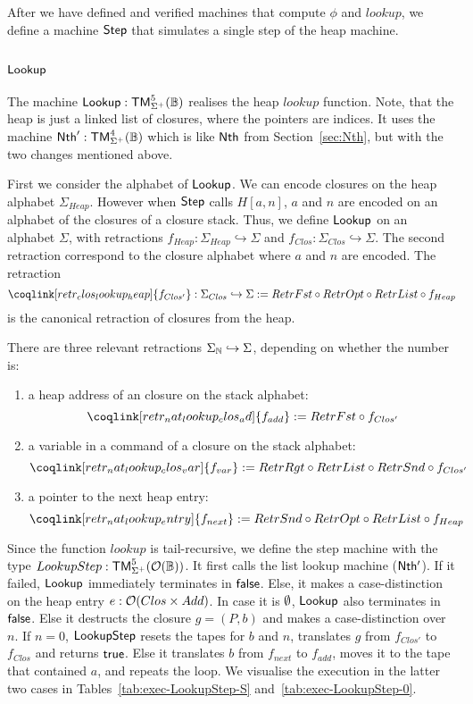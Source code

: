 After we have defined and verified machines that compute $\phi$ and $lookup$, we define a machine $\mathsf{Step}$ that simulates a single step of the heap
machine.


\subsection{$\mathsf{Lookup}$}
\label{sec:Lookup}
%

The machine $\mathsf{Lookup} : \mathsf{TM}_{\Sigma^+}^5(\mathbb{B})$ realises the heap $lookup$ function.  Note, that the heap is just a linked list of closures, where
the pointers are indices.  It uses the machine $\mathsf{Nth}' : \mathsf{TM}_{\Sigma^+}^4(\mathbb{B})$ which is like $\mathsf{Nth}$ from Section~\ref{sec:Nth}, but with the
two changes mentioned above.

First we consider the alphabet of $\mathsf{Lookup}$.  We can encode closures on the heap alphabet $\Sigma_{Heap}$.  However when $\mathsf{Step}$ calls
$H[a,n]$, $a$ and $n$ are encoded on an alphabet of the closures of a closure stack.  Thus, we define $\mathsf{Lookup}$ on an alphabet $\Sigma$, with
retractions $f_{Heap} : \Sigma_{Heap} \hookrightarrow \Sigma$ and $f_{Clos} : \Sigma_{Clos} \hookrightarrow \Sigma$.  The second retraction correspond
to the closure alphabet where $a$ and $n$ are encoded.  The retraction
\[
  \coqlink[retr_clos_lookup_heap]{f_{Clos'}} : \Sigma_{Clos} \hookrightarrow \Sigma := RetrFst \circ RetrOpt \circ RetrList \circ f_{Heap}
\]
is the canonical retraction of closures from the heap.

There are three relevant retractions $\Sigma_{\mathbb{N}} \hookrightarrow \Sigma$, depending on whether the number is:
\begin{enumerate}
\item a heap address of an closure on the stack alphabet:
  \[
    \coqlink[retr_nat_lookup_clos_ad]{f_{add}} := RetrFst \circ f_{Clos'}
  \]
\item a variable in a command of a closure on the stack alphabet:
  \[
    \coqlink[retr_nat_lookup_clos_var]{f_{var}} := RetrRgt \circ RetrList \circ RetrSnd \circ f_{Clos'}
  \]
\item a pointer to the next heap entry:
  \[
    \coqlink[retr_nat_lookup_entry]{f_{next}} := RetrSnd \circ RetrOpt \circ RetrList \circ f_{Heap}
  \]
\end{enumerate}

Since the function $lookup$ is tail-recursive, we define the step machine with the type $LookupStep : \mathsf{TM}_{\Sigma^+}^5(\mathcal{O}(\mathbb{B}))$.  It first
calls the list lookup machine ($\mathsf{Nth'}$).  If it failed, $\mathsf{Lookup}$ immediately terminates in $\mathsf{false}$.  Else, it makes a case-distinction on
the heap entry $e : \mathcal{O}(Clos \times Add)$.  In case it is $\emptyset$, $\mathsf{Lookup}$ also terminates in $\mathsf{false}$.  Else it destructs the closure
$g = (P,b)$ and makes a case-distinction over $n$.  If $n=0$, $\mathsf{LookupStep}$ resets the tapes for $b$ and $n$, translates $g$ from $f_{Clos'}$ to
$f_{Clos}$ and returns $\mathsf{true}$.  Else it translates $b$ from $f_{next}$ to $f_{add}$, moves it to the tape that contained $a$, and repeats the loop.
We visualise the execution in the latter two cases in Tables~\ref{tab:exec-LookupStep-S} and~\ref{tab:exec-LookupStep-0}.

